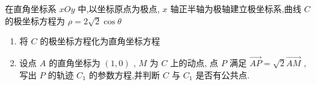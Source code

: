 \documentclass[class=ctexart,crop=false]{standalone}
\begin{document}
在直角坐标系 $xOy$ 中,以坐标原点为极点,
$x$ 轴正半轴为极轴建立极坐标系,曲线 $C$ 的极坐标方程为
$\rho=2 \sqrt{2}\cos{\theta}$
\begin{enumerate}[label=(\arabic*)]
    \item 将 $C$ 的极坐标方程化为直角坐标方程
    \item 设点 $A$ 的直角坐标为 $(1,0)$ , $M$ 为 $C$ 上的动点,
          点 $P$ 满足 $\overrightarrow {AP}=\sqrt{2} \overrightarrow {AM}$ ,
          写出 $P$ 的轨迹 $C_1$ 的参数方程,并判断 $C$ 与 $C_1$ 是否有公共点.
\end{enumerate}
\end{document}
